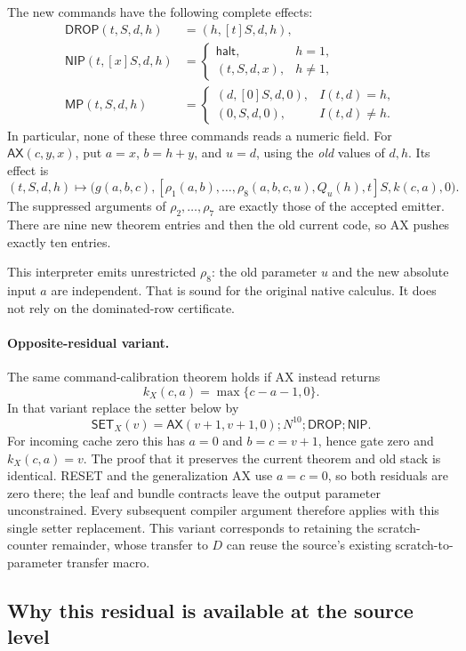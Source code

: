 The new commands have the following complete effects:
\begin{align*}
 \mathsf{DROP}(t,S,d,h)&=(h,[t]S,d,h),\\
 \mathsf{NIP}(t,[x]S,d,h)&=
  \begin{cases}\mathsf{halt},&h=1,\\(t,S,d,x),&h\ne1,\end{cases}\\
 \mathsf{MP}(t,S,d,h)&=
  \begin{cases}(d,[0]S,d,0),&I(t,d)=h,\\(0,S,d,0),&I(t,d)\ne h.\end{cases}
\end{align*}
In particular, none of these three commands reads a numeric field.
For $\mathsf{AX}(c,y,x)$, put $a=x$, $b=h+y$, and $u=d$, using the
\emph{old} values of $d,h$.  Its effect is
\[
 (t,S,d,h)\longmapsto
 \bigl(g(a,b,c),
 [\rho_1(a,b),\ldots,\rho_8(a,b,c,u),Q_u(h),t]S,
 k(c,a),0\bigr).
\]
The suppressed arguments of $\rho_2,\ldots,\rho_7$ are exactly those
of the accepted emitter.  There are nine new theorem entries and then the
old current code, so AX pushes exactly ten entries.

This interpreter emits unrestricted $\rho_8$: the old parameter $u$ and the
new absolute input $a$ are independent.  That is sound for the original
native calculus.  It does not rely on the dominated-row certificate.

\paragraph{Opposite-residual variant.}
The same command-calibration theorem holds if AX instead returns
\[
 k_X(c,a)=\max\{c-a-1,0\}.
\]
In that variant replace the setter below by
\[
 \mathsf{SET}_X(v)=
 \mathsf{AX}(v+1,v+1,0);N^{10};\mathsf{DROP};\mathsf{NIP}.
\]
For incoming cache zero this has $a=0$ and $b=c=v+1$, hence gate zero and
$k_X(c,a)=v$.  The proof that it preserves the current theorem and old
stack is identical.  RESET and the generalization AX use $a=c=0$, so both
residuals are zero there; the leaf and bundle contracts leave the output
parameter unconstrained.  Every subsequent compiler argument therefore
applies with this single setter replacement.  This variant corresponds
to retaining the scratch-counter remainder, whose transfer to $D$ can
reuse the source's existing scratch-to-parameter transfer macro.

\subsection{Why this residual is available at the source level}

